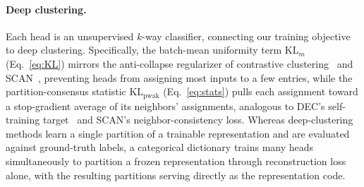 \paragraph{Deep clustering.}
Each head is an unsupervised $k$-way classifier, connecting our training
objective to deep clustering. Specifically, the batch-mean uniformity
term $\mathrm{KL}_m$ (Eq.~\eqref{eq:KL}) mirrors the anti-collapse
regularizer of contrastive clustering~\cite{li2021cc} and
SCAN~\cite{vangansbeke2020scan}, preventing heads from assigning most
inputs to a few entries, while the partition-consensus statistic
$\mathrm{KL}_{\mathrm{pwak}}$ (Eq.~\eqref{eq:stats}) pulls each
assignment toward a stop-gradient average of its neighbors' assignments,
analogous to DEC's self-training target~\cite{xie2016dec} and SCAN's
neighbor-consistency loss. Whereas deep-clustering methods learn a single
partition of a trainable representation and are evaluated against
ground-truth labels, a categorical dictionary trains many heads
simultaneously to partition a frozen representation through
reconstruction loss alone, with the resulting partitions serving directly
as the representation code.

